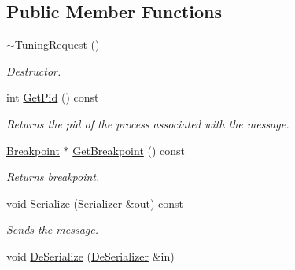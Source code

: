 \subsection*{Public Member Functions}
\begin{DoxyCompactItemize}
\item 
\hypertarget{class_common_1_1_tuning_request_acae0764e80b1f5808634a4b657f2ee5e}{\hyperlink{class_common_1_1_tuning_request_acae0764e80b1f5808634a4b657f2ee5e}{$\sim$\-Tuning\-Request} ()}\label{class_common_1_1_tuning_request_acae0764e80b1f5808634a4b657f2ee5e}

\begin{DoxyCompactList}\small\item\em Destructor. \end{DoxyCompactList}\item 
\hypertarget{class_common_1_1_tuning_request_acf7f45374392751fcc14fadbac737217}{int \hyperlink{class_common_1_1_tuning_request_acf7f45374392751fcc14fadbac737217}{Get\-Pid} () const }\label{class_common_1_1_tuning_request_acf7f45374392751fcc14fadbac737217}

\begin{DoxyCompactList}\small\item\em Returns the pid of the process associated with the message. \end{DoxyCompactList}\item 
\hypertarget{class_common_1_1_tuning_request_a214a3956bcf42e3f77d375ecff81bc18}{\hyperlink{class_common_1_1_breakpoint}{Breakpoint} $\ast$ \hyperlink{class_common_1_1_tuning_request_a214a3956bcf42e3f77d375ecff81bc18}{Get\-Breakpoint} () const }\label{class_common_1_1_tuning_request_a214a3956bcf42e3f77d375ecff81bc18}

\begin{DoxyCompactList}\small\item\em Returns breakpoint. \end{DoxyCompactList}\item 
\hypertarget{class_common_1_1_tuning_request_a144d686921a117ddc6480cae69c28a85}{void \hyperlink{class_common_1_1_tuning_request_a144d686921a117ddc6480cae69c28a85}{Serialize} (\hyperlink{class_common_1_1_serializer}{Serializer} \&out) const }\label{class_common_1_1_tuning_request_a144d686921a117ddc6480cae69c28a85}

\begin{DoxyCompactList}\small\item\em Sends the message. \end{DoxyCompactList}\item 
\hypertarget{class_common_1_1_tuning_request_a9ea5f3f99cee99247bc1dfa533a8da72}{void \hyperlink{class_common_1_1_tuning_request_a9ea5f3f99cee99247bc1dfa533a8da72}{De\-Serialize} (\hyperlink{class_common_1_1_de_serializer}{De\-Serializer} \&in)}\label{class_common_1_1_tuning_request_a9ea5f3f99cee99247bc1dfa533a8da72}


\end{DoxyCompactItemize}
